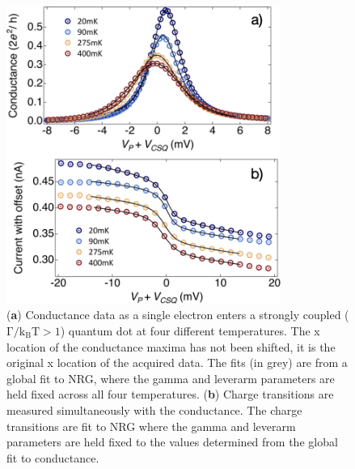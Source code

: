 \begin{figure}[!bht]
  \begin{center}
    \includegraphics[width=0.8\textwidth]{figures/ch3/crop_FiguresMaster.013.png}
    \caption[Method to determine gamma and leverarm and fit to charge transitions]{\label{fig:ch3/cond_ct_gf} 
    (\textbf{a}) Conductance data as a single electron enters a strongly coupled ($\mathrm{\Gamma/k_BT > 1}$) quantum dot at four different temperatures. The x location of the conductance maxima has not been shifted, it is the original x location of the acquired data. The fits (in grey) are from a global fit to NRG, where the gamma and leverarm parameters are held fixed across all four temperatures. (\textbf{b}) Charge transitions are measured simultaneously with the conductance. The charge transitions are fit to NRG where the gamma and leverarm parameters are held fixed to the values determined from the global fit to conductance.}
  \end{center}
\end{figure}

